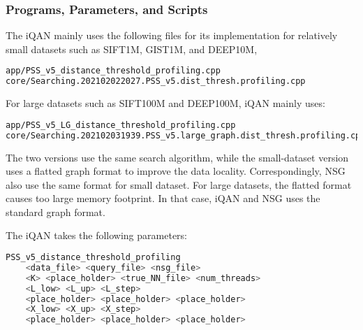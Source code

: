 

\subsubsection{Programs, Parameters, and Scripts}

The iQAN mainly uses the following files for its implementation for relatively small datasets such as SIFT1M, GIST1M, and DEEP10M, 
\begin{lstlisting}[language=bash]
app/PSS_v5_distance_threshold_profiling.cpp
core/Searching.202102022027.PSS_v5.dist_thresh.profiling.cpp
\end{lstlisting}

For large datasets such as SIFT100M and DEEP100M, iQAN mainly uses:
\begin{lstlisting}[language=bash]
app/PSS_v5_LG_distance_threshold_profiling.cpp
core/Searching.202102031939.PSS_v5.large_graph.dist_thresh.profiling.cpp
\end{lstlisting}

The two versions use the same search algorithm, while the small-dataset version uses a flatted graph format to improve the data locality. Correspondingly, NSG also use the same format for small dataset. For large datasets, the flatted format causes too large memory footprint. In that case, iQAN and NSG uses the standard graph format.

The iQAN takes the following parameters:
\begin{lstlisting}[language=bash]
PSS_v5_distance_threshold_profiling 
    <data_file> <query_file> <nsg_file> 
    <K> <place_holder> <true_NN_file> <num_threads> 
    <L_low> <L_up> <L_step> 
    <place_holder> <place_holder> <place_holder> 
    <X_low> <X_up> <X_step>
    <place_holder> <place_holder> <place_holder>
\end{lstlisting}


